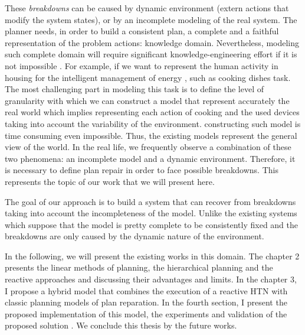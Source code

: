 These {\em breakdowns} can be caused by dynamic environment (extern actions that modify the system states), or by an incomplete modeling of the real system. The planner needs, in order to build a consistent plan, a complete and a faithful representation of the problem actions: knowledge domain. 
Nevertheless, modeling such complete domain will require significant knowledge-engineering effort if it is not impossible \cite{gil1992acquiring}. For example, if we want to represent the human activity in housing for the intelligent management of energy \cite{hurauxmodele}, such as cooking dishes task. The most challenging part in  modeling this task is to define the level of granularity with which we can construct a model that represent  accurately  the real world which implies representing each  action of cooking and the used devices taking into account the variability of the environment. constructing such model is  time consuming even impossible. Thus, the existing models represent the general view of the world.  In the real life, we frequently observe a combination of these two phenomena: an incomplete model and a dynamic environment. Therefore, it is necessary to define plan repair in order to face possible breakdowns. This represents the topic of our work that we will present here.
\par The goal of our approach is to build a system that can recover from breakdowns taking into account the incompleteness of the model. Unlike the existing systems which suppose that the model is pretty complete to be consistently fixed and the breakdowns are only caused by the dynamic nature of the environment. 
\par In the following, we will present the existing works in this domain. The chapter 2 presents the linear methods of planning, the hierarchical planning and the reactive approaches and discussing their advantages and limits. In the chapter 3, I propose a hybrid model that combines the execution of a reactive HTN with classic planning models of plan reparation. In the fourth section, I present the proposed implementation of this model, the experiments and validation of the proposed solution . We conclude this thesis by the future works. 
